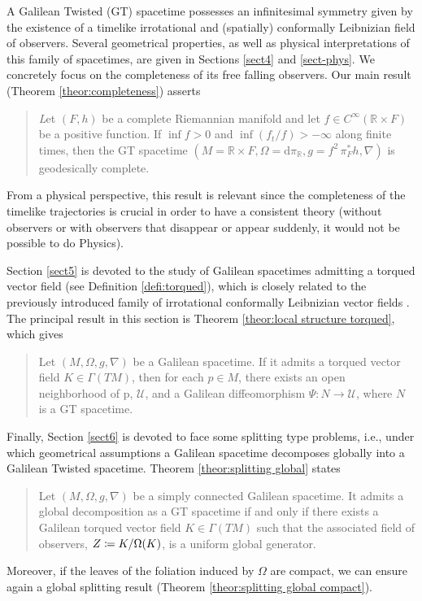 \documentclass[12pt]{article}
\newcommand{\diff}{\mathrm{d}}
\newcommand{\coloneq}{\vcentcolon\mathrel{\mkern -1.2mu}\mathrel{=}}
\newcommand{\spacetime}{(M,\Omega,g,\nabla)}
\def\R{\mathbb R}
\def\U{\mathcal U}
\begin{document}
A Galilean Twisted (GT) spacetime possesses an infinitesimal symmetry given by the existence of a timelike irrotational and (spatially) conformally Leibnizian field of observers.  Several geometrical properties, as well as physical interpretations of this family of spacetimes, are given in Sections \ref{sect4} and \ref{sect-phys}. We concretely focus on the completeness of its free falling observers. Our main result (Theorem \ref{theor:completeness}) asserts
\begin{quote} 
{\emph Let $(F,h)$ be a complete Riemannian manifold and let $f\in C^\infty(\R \times F)$ be a positive function. If $\inf f >0$ and $\inf (f_t/f)>-\infty$ along finite times, then the GT spacetime $(M=\R\times F, \Omega =\diff \pi_\R, g=f^2\, \pi_F^* h, \nabla)$ is geodesically complete.}
\end{quote}
From a physical perspective, this result is relevant since the completeness of the timelike trajectories is crucial in order to have a consistent theory (without observers or with observers that disappear or appear suddenly, it would not be possible to do Physics).

Section \ref{sect5} is devoted to the study of Galilean spacetimes admitting a torqued vector field (see Definition \ref{defi:torqued}), which is closely related to the previously introduced family of irrotational conformally Leibnizian vector fields \cite{GGRW}. The principal result in this section is Theorem \ref{theor:local structure torqued}, which gives
\begin{quote}
    Let $\spacetime$ be a Galilean spacetime.
    If it admits a torqued vector field $K\in \Gamma(TM)$, then for each $p\in M$, there exists an open neighborhood of p, $\U$, and a Galilean diffeomorphism $\Psi\colon N \to \U$, where $N$ is a GT spacetime. 
\end{quote}

Finally, Section \ref{sect6} is devoted to face some splitting type problems, i.e., under which geometrical assumptions a Galilean spacetime decomposes globally into a Galilean Twisted spacetime. Theorem \ref{theor:splitting global} states
\begin{quote}
\upshape
    Let $\spacetime$ be a simply connected Galilean spacetime.
    It admits a global decomposition as a GT spacetime if and only if there exists a Galilean torqued vector field $K\in \Gamma(TM)$ such that the associated field of observers, $Z\coloneq K/\Omega(K)$, is a uniform global generator.
\end{quote}
Moreover, if the leaves of the foliation induced by $\Omega$ are compact, we can ensure again a global splitting result (Theorem \ref{theor:splitting global compact}).
\end{document}
